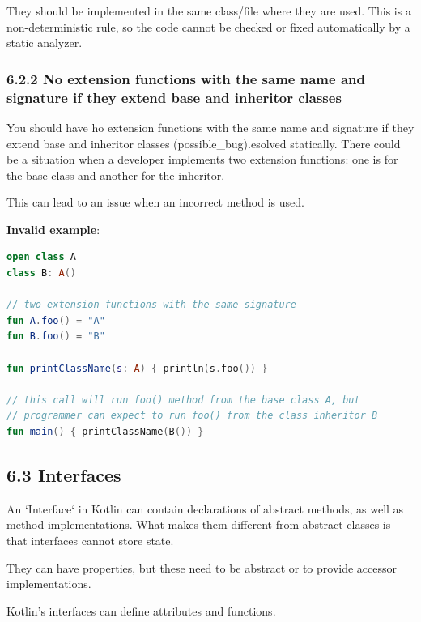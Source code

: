 {{{{They should be implemented in the same class/file where they are used. This is a non-deterministic rule, so the code cannot be checked or fixed automatically by a static analyzer.



\subsubsection*{\textbf{6.2.2 No extension functions with the same name and signature if they extend base and inheritor classes}}
\leavevmode\newline

\label{sec:6.2.2}

You should have ho extension functions with the same name and signature if they extend base and inheritor classes (possible\_bug).esolved statically. There could be a situation when a developer implements two extension functions: one is for the base class and another for the inheritor.

This can lead to an issue when an incorrect method is used.



\textbf{Invalid example}:

\begin{lstlisting}[language=Kotlin]
open class A
class B: A()

// two extension functions with the same signature
fun A.foo() = "A"
fun B.foo() = "B"

fun printClassName(s: A) { println(s.foo()) }

// this call will run foo() method from the base class A, but
// programmer can expect to run foo() from the class inheritor B
fun main() { printClassName(B()) }
\end{lstlisting}


\subsection*{\textbf{6.3 Interfaces}}

\label{sec:6.3}

An `Interface` in Kotlin can contain declarations of abstract methods, as well as method implementations. What makes them different from abstract classes is that interfaces cannot store state.

They can have properties, but these need to be abstract or to provide accessor implementations.



Kotlin's interfaces can define attributes and functions.

}}}}
